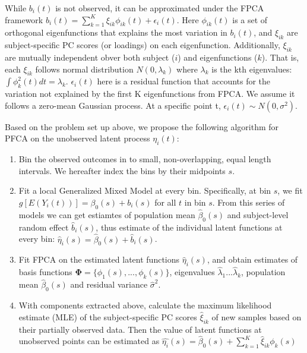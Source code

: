 \documentclass[
  11pt,
]{article}
\providecommand{\tightlist}{%
  \setlength{\itemsep}{0pt}\setlength{\parskip}{0pt}}
\begin{document}
While \(b_i(t)\) is not observed, it can be approximated under the FPCA
framework \(b_i(t)=\sum_{k=1}^K\xi_{ik}\phi_{ik}(t)+\epsilon_i(t)\).
Here \(\phi_{ik}(t)\) is a set of orthogonal eigenfunctions that
explains the most variation in \(b_i(t)\), and \(\xi_{ik}\) are
subject-specific PC scores (or loadings) on each eigenfunction.
Additionally, \(\xi_{ik}\) are mutually independent obver both subject
(\(i\)) and eigenfunctions (\(k\)). That is, each \(\xi_{ik}\) follows
normal distribution \(N(0, \lambda_k)\) where \(\lambda_k\) is the kth
eigenvalues: \(\int \phi_k^2(t)dt=\lambda_k\). \(\epsilon_i(t)\) here is
a residual function that accounts for the variation not explained by the
first K eigenfunctions from FPCA. We assume it follows a zero-mean
Gaussian process. At a specific point t,
\(\epsilon_i(t) \sim N(0, \sigma^2)\).

Based on the problem set up above, we propose the following algorithm
for PFCA on the unobserved latent process \(\eta_i(t)\):

\begin{enumerate}
\def\labelenumi{\arabic{enumi}.}
\tightlist
\item
  Bin the observed outcomes in to small, non-overlapping, equal length
  intervals. We hereafter index the bins by their midpoints \(s\).
\item
  Fit a local Generalized Mixed Model at every bin. Specifically, at bin
  \(s\), we fit \(g[E(Y_i(t))] = \beta_0(s)+b_i(s)\) for all \(t\) in
  bin \(s\). From this series of models we can get estiamtes of
  population mean \(\hat{\beta}_0(s)\) and subject-level random effect
  \(\hat{b}_i(s)\), thus estimate of the individual latent functions at
  every bin: \(\hat{\eta}_i(s) = \hat{\beta}_0(s)+\hat{b}_i(s)\).
\item
  Fit FPCA on the estimated latent functions \(\hat{\eta}_i(s)\), and
  obtain estimates of basis functions
  \(\boldsymbol{\Phi} = \{\phi_1(s), ...,\phi_k(s)\}\), eigenvalues
  \(\hat{\lambda}_1...\hat{\lambda}_k\), population mean
  \(\hat{\beta}_0(s)\) and residual variance \(\hat{\sigma}^2\).
\item
  With components extracted above, calculate the maximum likelihood
  estimate (MLE) of the subject-specific PC scores \(\hat{\xi}_{ik}\) of
  new samples based on their partially observed data. Then the value of
  latent functions at unobserved points can be estimated as
  \(\hat{\eta_i}(s)=\hat{\beta}_0(s)+\sum_{k=1}^K\hat{\xi}_{ik}{\phi}_k(s)\)
\end{enumerate}
\end{document}
